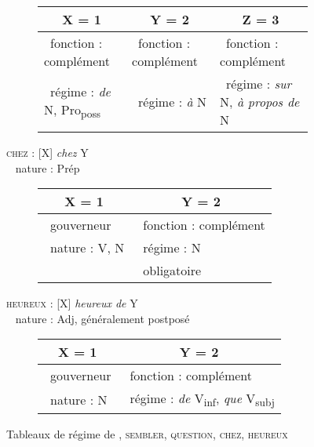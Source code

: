 \begin{figure}
\begin{subfigure}[h]{\textwidth}
		\begin{tabularx}{\textwidth}{|X|X|X|}
			\hline
			\multicolumn{1}{|c|}{X = 1 } & \multicolumn{1}{c|}{Y = 2} & \multicolumn{1}{c|}{Z = 3}\\
			\hline
			\textbullet~fonction : complément  & \textbullet~fonction : complément  & \textbullet~fonction : complément \\
			\textbullet~régime : \textit{de} N, Pro\textsubscript{poss} & \textbullet~régime : \textit{à} N & \textbullet~régime : \textit{sur} N, \textit{à propos de} N \\
			\hline
		\end{tabularx}
	\end{subfigure}%
	\vfill
	\begin{flushleft}
		\textsc{chez} : [X] \textit{chez} Y \\
		\textbullet~ nature : Prép
	\end{flushleft}
	\begin{subfigure}[h]{\textwidth}
		\centering
		\vspace*{-\baselineskip+5pt}
		\begin{tabularx}{\textwidth}{|X|X|}
			\hline
			\multicolumn{1}{|c|}{X = 1 } & \multicolumn{1}{c|}{Y = 2} \\
			\hline
			\textbullet~gouverneur & \textbullet~fonction : complément \\
			\textbullet~nature : V, N & \textbullet~régime : N \\
			& \textbullet~obligatoire \\
			\hline
		\end{tabularx}
	\end{subfigure}%
	\vfill
	\begin{flushleft}
		\textsc{heureux} : [X] \textit{heureux de} Y \\
		\textbullet~ nature : Adj, généralement postposé
	\end{flushleft}
	\begin{subfigure}[h]{\textwidth}
		\centering
		\vspace*{-\baselineskip+5pt}
		\begin{tabularx}{\textwidth}{|X|X|}
			\hline
			\multicolumn{1}{|c|}{X = 1 } & \multicolumn{1}{c|}{Y = 2} \\
			\hline
			\textbullet~gouverneur & \textbullet~fonction : complément \\
			\textbullet~nature : N & \textbullet~régime : \textit{de} V\textsubscript{inf}, \textit{que} V\textsubscript{subj} \\
			\hline
		\end{tabularx}
	\end{subfigure}

\caption{Tableaux de régime de , \textsc{sembler}, \textsc{question}, \textsc{chez}, \textsc{heureux}\label{fig:13-regime}}
\end{figure}

